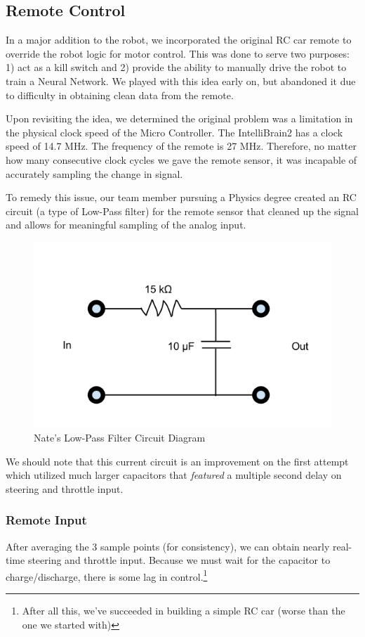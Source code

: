 \documentclass[12pt]{article}
\begin{document}
\clearpage
\subsection{Remote Control}
In a major addition to the robot, we incorporated the original RC car remote to override the robot logic for motor control.  This was done to serve two purposes: 1) act as a kill switch and 2) provide the ability to manually drive the robot to train a Neural Network.  We played with this idea early on, but abandoned it due to difficulty in obtaining clean data from the remote.

Upon revisiting the idea, we determined the original problem was a limitation in the physical clock speed of the Micro Controller.  The IntelliBrain2 has a clock speed of 14.7 MHz.  The frequency of the remote is 27 MHz.  Therefore, no matter how many consecutive clock cycles we gave the remote sensor, it was incapable of accurately sampling the change in signal.

To remedy this issue, our team member pursuing a Physics degree created an RC circuit (a type of Low-Pass filter) for the remote sensor that cleaned up the signal and allows for meaningful sampling of the analog input.  
\begin{figure}[h]
\centerline{\includegraphics[scale=.5]{img/circuit}}
\caption{Nate's Low-Pass Filter Circuit Diagram}
\end{figure}

We should note that this current circuit is an improvement on the first attempt which utilized much larger capacitors that \textit{featured} a multiple second delay on steering and throttle input.

\subsubsection*{Remote Input}
After averaging the 3 sample points (for consistency), we can obtain nearly real-time steering and throttle input.  Because we must wait for the capacitor to charge/discharge, there is some lag in control.\footnote{After all this, we've succeeded in building a simple RC car (worse than the one we started with)}
\end{document}
